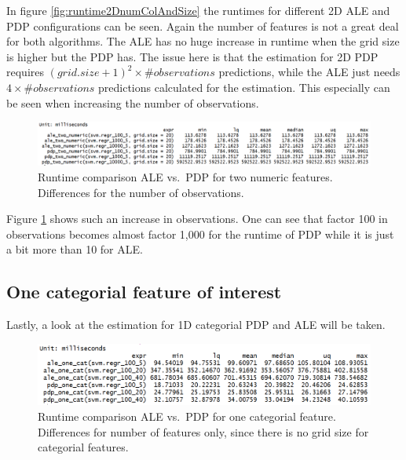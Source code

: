 \documentclass[]{krantz}
\begin{document}
In figure \ref{fig:runtime2DnumColAndSize} the runtimes for different 2D
ALE and PDP configurations can be seen. Again the number of features is
not a great deal for both algorithms. The ALE has no huge increase in
runtime when the grid size is higher but the PDP has. The issue here is
that the estimation for 2D PDP requires
\((grid.size + 1)^2 \times \#observations\) predictions, while the ALE
just needs \(4 \times \#observations\) predictions calculated for the
estimation. This especially can be seen when increasing the number of
observations.

\begin{figure}
\includegraphics[width=1\linewidth]{images/ale_1_two_numeric_nrows} \caption{Runtime comparison ALE vs.~PDP for two numeric
features. Differences for the number of observations.}\label{fig:runtime2DnumNrow}
\end{figure}




Figure \ref{fig:runtime2DnumNrow} shows such an increase in
observations. One can see that factor 100 in observations becomes almost
factor 1,000 for the runtime of PDP while it is just a bit more than 10
for ALE.

\subsection{One categorial feature of
interest}\label{one-categorial-feature-of-interest}

Lastly, a look at the estimation for 1D categorial PDP and ALE will be
taken.

\begin{figure}
\includegraphics[width=1\linewidth]{images/ale_1_one_cat_cols_and_gridsize} \caption{Runtime comparison ALE vs.~PDP for one
categorial feature. Differences for number of features only, since there
is no grid size for categorial features.}\label{fig:runtime1DcatColAndSize}
\end{figure}
\end{document}
